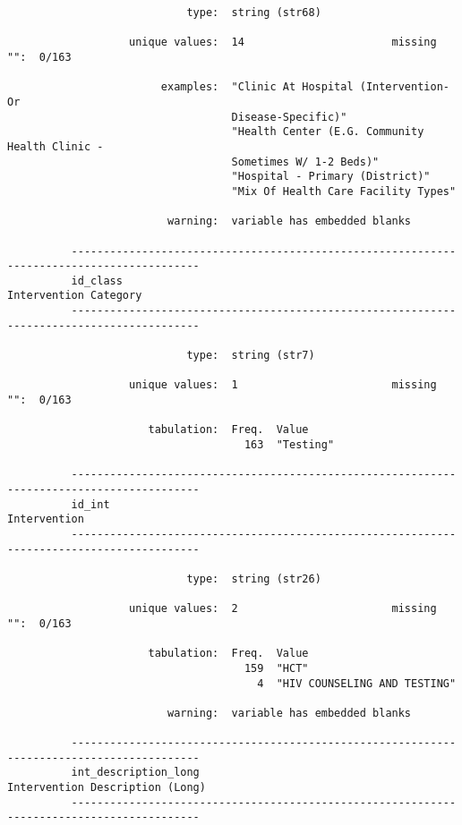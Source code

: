 \documentclass{article}
\begin{document}
\begin{verbatim}
                            type:  string (str68)
          
                   unique values:  14                       missing "":  0/163
          
                        examples:  "Clinic At Hospital (Intervention- Or
                                   Disease-Specific)"
                                   "Health Center (E.G. Community Health Clinic -
                                   Sometimes W/ 1-2 Beds)"
                                   "Hospital - Primary (District)"
                                   "Mix Of Health Care Facility Types"
          
                         warning:  variable has embedded blanks
          
          ------------------------------------------------------------------------------------------
          id_class                                                             Intervention Category
          ------------------------------------------------------------------------------------------
          
                            type:  string (str7)
          
                   unique values:  1                        missing "":  0/163
          
                      tabulation:  Freq.  Value
                                     163  "Testing"
          
          ------------------------------------------------------------------------------------------
          id_int                                                                        Intervention
          ------------------------------------------------------------------------------------------
          
                            type:  string (str26)
          
                   unique values:  2                        missing "":  0/163
          
                      tabulation:  Freq.  Value
                                     159  "HCT"
                                       4  "HIV COUNSELING AND TESTING"
          
                         warning:  variable has embedded blanks
          
          ------------------------------------------------------------------------------------------
          int_description_long                                       Intervention Description (Long)
          ------------------------------------------------------------------------------------------
          

\end{verbatim}
\end{document}
